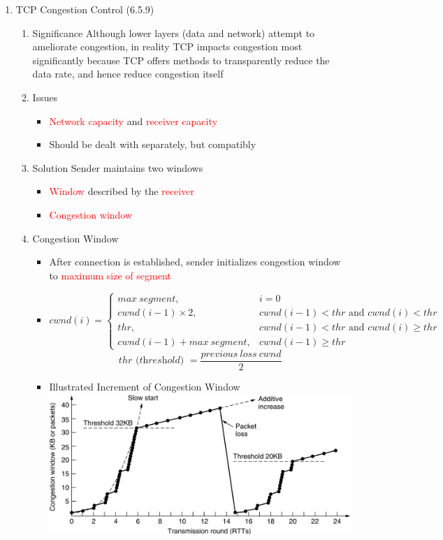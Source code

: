 \documentclass[a4paper,10pt]{article}
\newcommand{\red}[1]{\textcolor{red}{#1}}
\begin{document}
\begin{enumerate}
  \item TCP Congestion Control (6.5.9)
  \begin{enumerate}
    \item Significance
      \newline Although lower layers (data and network) attempt to ameliorate congestion, in reality TCP impacts congestion most significantly because TCP offers methods to transparently reduce the data rate, and hence reduce congestion itself
    \item Issues
      \begin{itemize}
        \item \red{Network capacity} and \red{receiver capacity}
        \item Should be dealt with separately, but compatibly
      \end{itemize}
    \item Solution
      \newline Sender maintains two windows
      \begin{itemize}
        \item \red{Window} described by the \red{receiver}
        \item \red{Congestion window}
      \end{itemize}
    \item Congestion Window
      \begin{itemize}
        \item After connection is established, sender initializes congestion window to \red{maximum size of segment}
        \item\[
                cwnd(i) =
                  \begin{cases}
                    max\ segment,               & i = 0 \\
                    cwnd(i-1)\times 2,          & cwnd(i-1) < thr \text{ and } cwnd(i) < thr \\
                    thr,                        & cwnd(i-1) < thr \text{ and } cwnd(i) \geq thr \\
                    cwnd(i-1) + max\ segment,   & cwnd(i-1) \geq thr
                  \end{cases}
             \]
             $$ thr\textit{ (threshold) } = \frac{previous\ loss\ cwnd}{2} $$
        \item Illustrated Increment of Congestion Window
          \newline\includegraphics[width=\textwidth]{congestionwindow}

\end{itemize}
\end{enumerate}
\end{enumerate}
\end{document}
